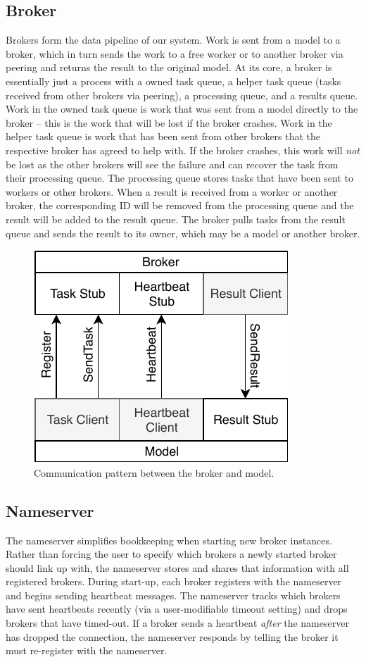 \documentclass[conference]{IEEEtran}
\begin{document}
\subsection{Broker}
Brokers form the data pipeline of our system. Work is sent from a model to a
broker, which in turn sends the work to a free worker or to another broker via
peering and returns the result to
the original model. At its core, a broker is essentially just a process with a
owned task queue, a helper task queue (tasks received from other brokers
via peering), a
processing queue, and a results queue. Work in the owned task queue is work that
was sent from a model directly to the broker -- this is the work that will be
lost if the broker crashes. Work in the helper task queue is work that has been
sent from other brokers that the respective broker has agreed to help with. If
the broker crashes, this work will \emph{not} be lost as the other brokers will
see the failure and can recover the task from their processing queue. The
processing queue stores tasks that have been sent to workers or other
brokers. When a result is received from a worker or another broker, the
corresponding ID will be removed from the processing queue and the result will
be added to the result queue. The broker pulls tasks from the result queue and
sends the result to its owner, which may be a model or another broker.

\begin{figure}
  \centering
  \includegraphics{img/model_broker}
  \caption{Communication pattern between the broker and
    model.}\label{fig:broker-model}
\end{figure}

\subsection{Nameserver}
The nameserver simplifies bookkeeping when starting new broker instances.
Rather than forcing the user to specify which brokers a newly started broker
should link up with, the nameserver stores and shares that information with all
registered brokers. During start-up, each broker registers with the nameserver
and begins sending heartbeat messages. The nameserver tracks which brokers have
sent heartbeats recently (via a user-modifiable timeout setting) and drops
brokers that have timed-out. If a broker sends a heartbeat \emph{after} the
nameserver has dropped the connection, the nameserver responds by telling the
broker it must re-register with the nameserver.
\end{document}
